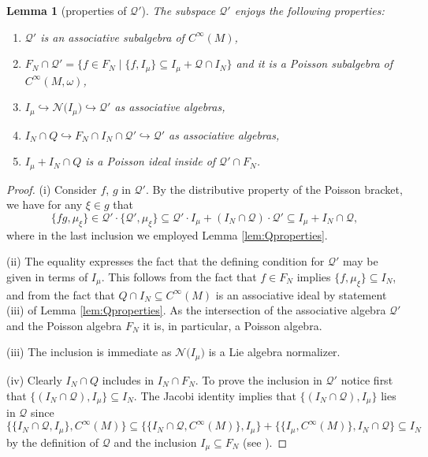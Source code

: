 \documentclass[pdftex]{sigma}
\numberwithin{equation}{section}
\newtheorem{Lemma}[Theorem]{Lemma}
\renewcommand{\subset}{\subseteq}
\begin{document}
\begin{Lemma}[properties of $\mathcal{Q}'$]\label{lem:Qprimeproperties}
	The subspace $\mathcal{Q}'$ enjoys the following properties:
	\begin{enumerate}\itemsep=0pt
		\item[$(i)$] $\mathcal{Q}'$ is an associative subalgebra of $C^\infty(M)$,
		\item[$(ii)$] $F_N\cap\mathcal{Q}'=\{f\in F_N \mid  \{f,I_\mu\}\subset I_\mu + \mathcal{Q}\cap I_N \}$ and it is a Poisson subalgebra of $C^\infty(M,\omega)$,
		\item[$(iii)$] $I_\mu\hookrightarrow \mathcal{N}\bigl(I_\mu\bigr)\hookrightarrow \mathcal{Q}'$ as associative algebras,
		\item[$(iv)$] $I_N\cap Q \hookrightarrow F_N\cap I_N \cap \mathcal{Q}' \hookrightarrow \mathcal{Q}'$ as associative algebras,
		\item[$(v)$] $I_\mu+I_N\cap Q$ is a Poisson ideal inside of $\mathcal{Q}'\cap F_N$.
	\end{enumerate}
\end{Lemma}
\begin{proof}
		(i)
		Consider $f$, $g$ in $\mathcal{Q}'$. By the distributive property of the Poisson bracket, we have for any $\xi \in g$ that
		\[
			\{f g, \mu_\xi\} \in \mathcal{Q}'\cdot\bigl\{\mathcal{Q}',\mu_\xi\bigr\}
			\subset
			\mathcal{Q}'\cdot I_\mu + (I_N\cap \mathcal{Q})\cdot \mathcal{Q}'
			\subset
			I_\mu+ I_N \cap \mathcal{Q},
		\]
		where in the last inclusion we employed Lemma \ref{lem:Qproperties}.

		(ii)
		The equality expresses the fact that the defining condition for $\mathcal{Q}'$ may be given in terms of $I_\mu$.
		This follows from the fact that $f \in F_N$ implies $\{f,\mu_\xi\}\subset I_N$, and from the fact that $Q\cap I_N\subset C^\infty(M)$ is an associative ideal by statement (iii) of Lemma \ref{lem:Qproperties}.
		As the intersection of the associative algebra $\mathcal{Q}'$ and the Poisson algebra $F_N$ it is, in particular, a Poisson algebra.

		(iii)
			The inclusion is immediate as $\mathcal{N}\bigl(I_\mu\bigr)$ is a Lie algebra normalizer.
		
        (iv)
			Clearly $I_N\cap Q$ includes in $I_N\cap F_N$.
			To prove the inclusion in $\mathcal{Q}'$ notice first that $\{(I_N\cap \mathcal{Q}),I_\mu\}\subset I_N$.
			The Jacobi identity implies that $\{(I_N\cap \mathcal{Q}),I_\mu\}$ lies in $\mathcal{Q}$ since
			\[
				 \{\{I_N\cap\mathcal{Q},I_\mu\},C^\infty(M) \}
				\subset
				 \{\{I_N\cap\mathcal{Q},C^\infty(M)\},I_\mu \}
				+
				 \{\{I_\mu,C^\infty(M)\},I_N\cap\mathcal{Q}  \}
				\subset
				I_N
			\]
	by the definition of $\mathcal{Q}$ and the inclusion $I_\mu\subset F_N$ (see \cite[Proposition~5.1]{ArmsGotayJennings90}).
\end{proof}
\end{document}
